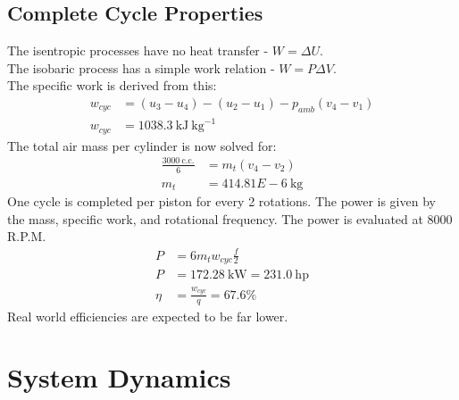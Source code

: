 \documentclass[10pt,a4paper]{article}
\begin{document}
	\subsection*{Complete Cycle Properties}
	The isentropic processes have no heat transfer - $W = \Delta U$.\\
	The isobaric process has a simple work relation - $W = P \Delta V$.\\
	The specific work is derived from this:
	\begin{align}
		w_{cyc} &= (u_3-u_4) - (u_2-u_1) - p_{amb}(v_4 - v_1) \\
		w_{cyc} &= 1038.3\ \text{kJ}\ \text{kg}^{-1}
	\end{align}
	The total air mass per cylinder is now solved for:
	\begin{align}
		\frac{3000\ \text{c.c.}}{6} &= m_t(v_4-v_2)\\
		m_t &= 414.81E-6\ \text{kg}
	\end{align}
	One cycle is completed per piston for every 2 rotations. The power is given by the mass, specific work, and rotational frequency. The power is evaluated at 8000 R.P.M.
	\begin{align}
		P &= 6 m_t w_{cyc} \frac{f}{2}\\
		P &= 172.28\ \text{kW}= 231.0\ \text{hp}\\
		\eta &= \frac{w_{cyc}}{q}= 67.6 \%
	\end{align}
	Real world efficiencies are expected to be far lower.
	\newpage
	
	\section*{System Dynamics}
	
\end{document}
